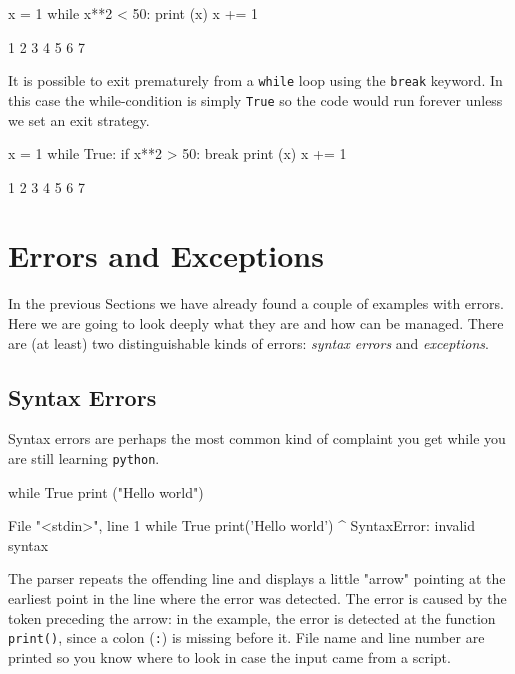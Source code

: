 \begin{ipython}
x = 1
while x**2 < 50:
    print (x)
    x += 1	
\end{ipython}
\begin{ioutput}
1
2
3
4
5
6
7	
\end{ioutput}

It is possible to exit prematurely from a \texttt{while} loop using the \texttt{break} keyword. In this case the while-condition is simply \texttt{True} so the code would run forever unless we set an exit strategy.

\begin{ipython}
x = 1
while True:
    if x**2 > 50:
        break
    print (x)
    x += 1	
\end{ipython}
\begin{ioutput}
1
2
3
4
5
6
7	
\end{ioutput}

\section{Errors and Exceptions}
In the previous Sections we have already found a couple of examples with errors. Here we are going to look deeply what they are and how can be managed. There are (at least) two distinguishable kinds of errors:  \emph{syntax errors} and \emph{exceptions}.

\subsection{Syntax Errors}
Syntax errors are perhaps the most common kind of complaint you get while you are still learning \texttt{python}.

\begin{ipython}
while True
    print ("Hello world")
\end{ipython}
\begin{ioutput}
  File "<stdin>", line 1
    while True print('Hello world')
               ^
SyntaxError: invalid syntax
\end{ioutput}

The parser repeats the offending line and displays a little "arrow" pointing at the earliest point in the line where the error was detected. The error is caused by the token preceding the arrow: in the example, the error is detected at the function \texttt{print()}, since a colon (\texttt{:}) is missing before it. File name and line number are printed so you know where to look in case the input came from a script.

